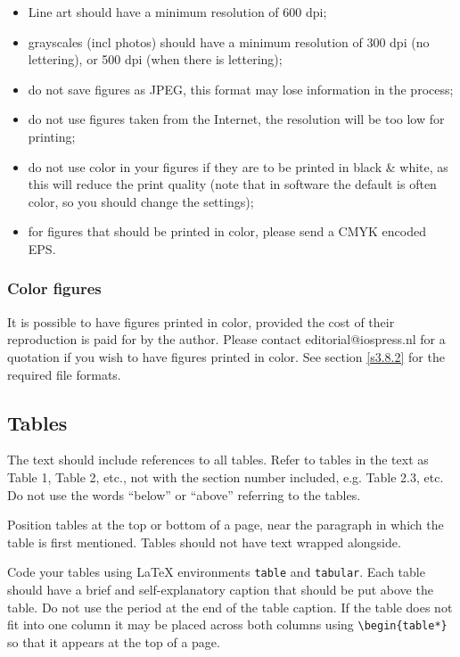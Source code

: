 \documentclass{iosart2c}
\begin{document}
\begin{itemize}
\item Line art should have a minimum resolution of 600 dpi;  %
\item  grayscales (incl photos) should have a minimum resolution of 300 dpi (no lettering), or 500 dpi (when there is lettering); %
\item  do not save figures as JPEG, this format may lose information in the
process;
\item  do not use figures taken from the Internet, the resolution will be too low for
printing;
\item  do not use color in your figures if they are to be printed in black \& white, as this will reduce the print
quality (note that in software the default is often color, so you should change the
settings);
\item  for figures that should be printed in color, please send a CMYK encoded EPS.%
\end{itemize}

\subsubsection{Color figures}
It is possible to have figures printed in color,
provided the cost of their reproduction is paid for by the author.
Please contact editorial@iospress.nl for a quotation if you wish to have figures printed in color.
See section \ref{s3.8.2} for the required file formats.

\subsection{Tables}

The text should include references to all tables.
Refer to tables in the text as Table 1, Table 2, etc., not with the section number included,
 e.g. Table 2.3, etc. Do not use the words ``below'' or ``above'' referring to the
 tables.

Position tables at the top or bottom of a page, near the paragraph in which the table is first mentioned.
Tables should not have text wrapped alongside.


Code your tables using \LaTeX{} environments \verb|table| and
\verb|tabular|. Each table should have a brief and self-explanatory caption that should be put above the
table. Do not use the period at the end of the table caption. If the table does not fit into one column it may be placed across both columns
using \verb-\begin{table*}-
so that it
appears at the top of a page.
\end{document}
